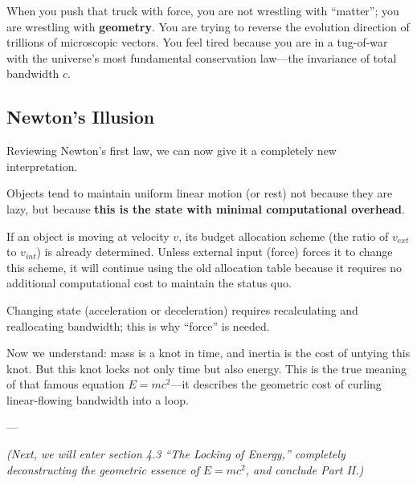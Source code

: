 When you push that truck with force, you are not wrestling with ``matter''; you are wrestling with \textbf{geometry}. You are trying to reverse the evolution direction of trillions of microscopic vectors. You feel tired because you are in a tug-of-war with the universe's most fundamental conservation law---the invariance of total bandwidth $c$.

\subsection{Newton's Illusion}

Reviewing Newton's first law, we can now give it a completely new interpretation.

Objects tend to maintain uniform linear motion (or rest) not because they are lazy, but because \textbf{this is the state with minimal computational overhead}.

If an object is moving at velocity $v$, its budget allocation scheme (the ratio of $v_{ext}$ to $v_{int}$) is already determined. Unless external input (force) forces it to change this scheme, it will continue using the old allocation table because it requires no additional computational cost to maintain the status quo.

Changing state (acceleration or deceleration) requires recalculating and reallocating bandwidth; this is why ``force'' is needed.

Now we understand: mass is a knot in time, and inertia is the cost of untying this knot. But this knot locks not only time but also energy. This is the true meaning of that famous equation $E=mc^2$---it describes the geometric cost of curling linear-flowing bandwidth into a loop.

---

\textit{(Next, we will enter section 4.3 ``The Locking of Energy,'' completely deconstructing the geometric essence of $E=mc^2$, and conclude Part II.)}

